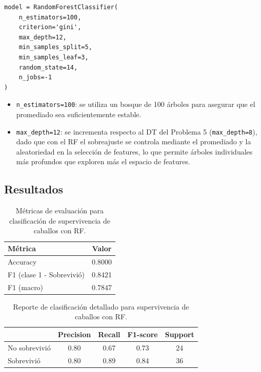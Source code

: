 \documentclass{article}
\begin{document}
\begin{lstlisting}
model = RandomForestClassifier(
    n_estimators=100,
    criterion='gini',
    max_depth=12,
    min_samples_split=5,
    min_samples_leaf=3,
    random_state=14,
    n_jobs=-1
)
\end{lstlisting}

\begin{itemize}
    \item \texttt{n\_estimators=100}: se utiliza un bosque de 100 árboles para asegurar que el promediado sea suficientemente estable.
    \item \texttt{max\_depth=12}: se incrementa respecto al DT del Problema 5 (\texttt{max\_depth=8}), dado que con el RF el sobreajuste se controla mediante el promediado y la aleatoriedad en la selección de features, lo que permite árboles individuales más profundos que exploren más el espacio de features.
\end{itemize}

\subsection{Resultados}

\begin{table}[H]
\centering
\begin{tabular}{lc}
\hline
\textbf{Métrica} & \textbf{Valor} \\
\hline
Accuracy & 0.8000 \\
F1 (clase 1 - Sobrevivió) & 0.8421 \\
F1 (macro) & 0.7847 \\
\hline
\end{tabular}
\caption{Métricas de evaluación para clasificación de supervivencia de caballos con RF.}
\label{tab:p10_resultados}
\end{table}

\begin{table}[H]
\centering
\begin{tabular}{lcccc}
\hline
& \textbf{Precision} & \textbf{Recall} & \textbf{F1-score} & \textbf{Support} \\
\hline
No sobrevivió & 0.80 & 0.67 & 0.73 & 24 \\
Sobrevivió    & 0.80 & 0.89 & 0.84 & 36 \\
\hline
\end{tabular}
\caption{Reporte de clasificación detallado para supervivencia de caballos con RF.}
\label{tab:p10_report}
\end{table}
\end{document}
